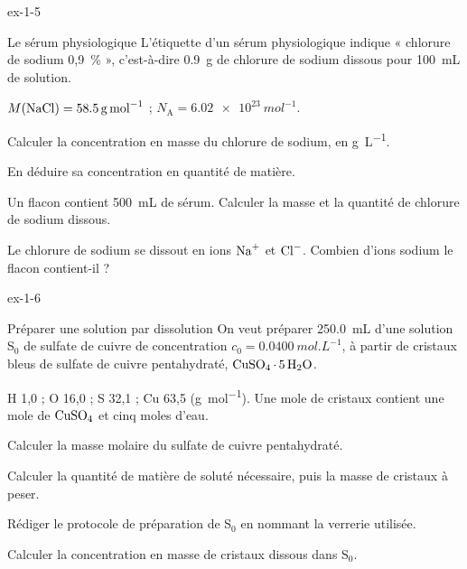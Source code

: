 \begin{blocLivre}{ex-1-5}
\begin{exercice}[1]{Le sérum physiologique}
L'étiquette d'un sérum physiologique indique « chlorure de sodium 0,9~\% », c'est-à-dire \qty{0,9}{g} de chlorure de sodium
dissous pour \qty{100}{mL} de solution.
\begin{donnees}
$M(\ce{NaCl})=\qty{58,5}{g.mol^{-1}}$ ; $N_\mathrm{A}=\qty{6,02e23}{mol^{-1}}$.
\end{donnees}
\begin{questions}
\item Calculer la concentration en masse du chlorure de sodium, en \unit{g.L^{-1}}.
\item En déduire sa concentration en quantité de matière.
\item Un flacon contient \qty{500}{mL} de sérum. Calculer la masse et la quantité de chlorure de sodium dissous.
\item Le chlorure de sodium se dissout en ions $\ce{Na+}$ et $\ce{Cl-}$. Combien d'ions sodium le flacon contient-il ?
\end{questions}
\end{exercice}
\end{blocLivre}
\begin{blocLivre}{ex-1-6}
\begin{exercice}[2]{Préparer une solution par dissolution}
On veut préparer \qty{250,0}{mL} d'une solution S$_0$ de sulfate de cuivre de concentration $c_0=\qty{0,0400}{mol.L^{-1}}$, à partir de
cristaux bleus de sulfate de cuivre pentahydraté, $\ce{CuSO4*5H2O}$.
\begin{donnees}
H 1,0 ; O 16,0 ; S 32,1 ; Cu 63,5 (\unit{g.mol^{-1}}). Une mole de cristaux contient une mole de $\ce{CuSO4}$ et cinq moles d'eau.
\end{donnees}
\begin{questions}
\item Calculer la masse molaire du sulfate de cuivre pentahydraté.
\item Calculer la quantité de matière de soluté nécessaire, puis la masse de cristaux à peser.
\item Rédiger le protocole de préparation de S$_0$ en nommant la verrerie utilisée.
\item Calculer la concentration en masse de cristaux dissous dans S$_0$.
\end{questions}
\end{exercice}
\end{blocLivre}
